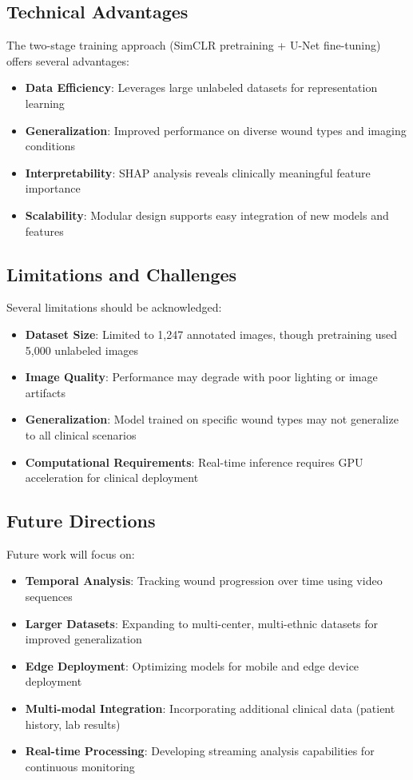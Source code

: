 \documentclass[conference]{IEEEtran}
\begin{document}
\subsection{Technical Advantages}
The two-stage training approach (SimCLR pretraining + U-Net fine-tuning) offers several advantages:
\begin{itemize}
\item \textbf{Data Efficiency}: Leverages large unlabeled datasets for representation learning
\item \textbf{Generalization}: Improved performance on diverse wound types and imaging conditions
\item \textbf{Interpretability}: SHAP analysis reveals clinically meaningful feature importance
\item \textbf{Scalability}: Modular design supports easy integration of new models and features
\end{itemize}

\subsection{Limitations and Challenges}
Several limitations should be acknowledged:
\begin{itemize}
\item \textbf{Dataset Size}: Limited to 1,247 annotated images, though pretraining used 5,000 unlabeled images
\item \textbf{Image Quality}: Performance may degrade with poor lighting or image artifacts
\item \textbf{Generalization}: Model trained on specific wound types may not generalize to all clinical scenarios
\item \textbf{Computational Requirements}: Real-time inference requires GPU acceleration for clinical deployment
\end{itemize}

\subsection{Future Directions}
Future work will focus on:
\begin{itemize}
\item \textbf{Temporal Analysis}: Tracking wound progression over time using video sequences
\item \textbf{Larger Datasets}: Expanding to multi-center, multi-ethnic datasets for improved generalization
\item \textbf{Edge Deployment}: Optimizing models for mobile and edge device deployment
\item \textbf{Multi-modal Integration}: Incorporating additional clinical data (patient history, lab results)
\item \textbf{Real-time Processing}: Developing streaming analysis capabilities for continuous monitoring
\end{itemize}
\end{document}
